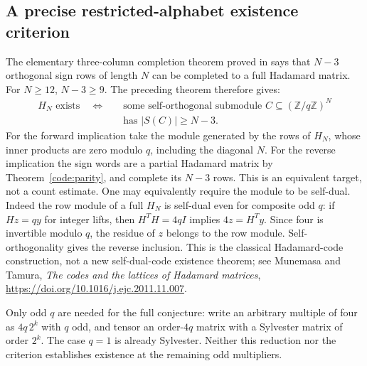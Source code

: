 \subsection{A precise restricted-alphabet existence criterion}
The elementary three-column completion theorem proved in
 says that $N-3$ orthogonal
sign rows of length $N$ can be completed to a full Hadamard matrix.
For $N\ge12$, $N-3\ge9$. The preceding theorem therefore gives:
\[
 \begin{split}
 H_N\text{ exists}\quad\Longleftrightarrow\quad&
 \text{some self-orthogonal submodule }C\subseteq
 (\mathbb Z/q\mathbb Z)^N\\[-2pt]
 &\text{has }|S(C)|\ge N-3.
 \end{split}
\]
For the forward implication take the module generated by the rows
of $H_N$, whose inner products are zero modulo $q$, including the
diagonal $N$. For the reverse implication the sign words are a
partial Hadamard matrix by Theorem~\ref{code:parity}, and complete
its $N-3$ rows. This is an equivalent target, not a count estimate.
One may equivalently require the module to be self-dual. Indeed the
row module of a full $H_N$ is self-dual even for composite odd $q$:
if $Hz=qy$ for integer lifts, then $H^TH=4qI$ implies
$4z=H^Ty$. Since four is invertible modulo $q$, the residue of
$z$ belongs to the row module. Self-orthogonality gives the reverse
inclusion. This is the classical Hadamard-code construction, not
a new self-dual-code existence theorem; see Munemasa and Tamura,
\emph{The codes and the lattices of Hadamard matrices},
\url{https://doi.org/10.1016/j.ejc.2011.11.007}.

Only odd $q$ are needed for the full conjecture: write an arbitrary
multiple of four as $4q\,2^k$ with $q$ odd, and tensor an order-$4q$
matrix with a Sylvester matrix of order $2^k$. The case $q=1$
is already Sylvester. Neither this reduction nor the criterion
establishes existence at the remaining odd multipliers.


